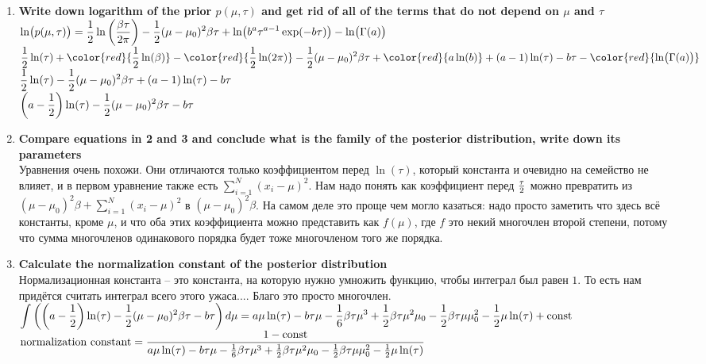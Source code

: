 \documentclass{article}
\newcommand{\red}[1]{{\color{red}{#1}}}
\begin{document}
{\begin{enumerate}
    \item \textbf{Write down logarithm of the prior $p(\mu, \tau)$ and get rid of all of the terms that do not depend on $\mu$ and $\tau$} \\
      $\displaystyle \ln \bigl(p(\mu, \tau)\bigr) = \frac12\ln\left(\frac{\beta \tau}{2\pi}\right) - \frac12 (\mu - \mu_0)^2\beta\tau + \ln\bigl(b^a \tau^{a-1}\exp(-b\tau)\bigr) - \ln\bigl(\Gamma(a)\bigr) $ \vspace{0.5em} \\
      $\ds \f12\ln(\tau) + \red{\f12\ln(\beta)} - \red{\f12\ln(2\pi)} - \f12 (\mu - \mu_0)^2\beta\tau +
      \red{a\ln(b)} + (a-1)\ln(\tau) - b\tau - \red{\ln\bigl(\Gamma(a)\bigr)}$ \vspace{0.5em} \\
      $\displaystyle \frac12\ln(\tau) - \frac12 (\mu - \mu_0)^2\beta\tau + (a-1)\ln(\tau) - b\tau$ \vspace{0.5em} \\
      $\displaystyle \left(a-\frac12\right)\ln(\tau) - \frac12 (\mu - \mu_0)^2\beta\tau - b\tau$

    \item \textbf{Compare equations in 2 and 3 and conclude what is the family of the posterior distribution, write down its parameters} \\
      Уравнения очень похожи.
      Они отличаются только коэффициентом перед $\ln(\tau)$, который константа и очевидно на семейство не влияет,
      и в первом уравнение также есть $\sum_{i=1}^N (x_i - \mu)^2$.
      Нам надо понять как коэффициент перед $\frac\tau2$ можно превратить из $(\mu - \mu_0)^2\beta + \sum_{i=1}^N (x_i - \mu)^2$
      в $(\mu - \mu_0)^2\beta$.
      На самом деле это проще чем могло казаться: надо просто заметить что здесь всё константы, кроме $\mu$,
      и что оба этих коэффициента можно представить как $f(\mu)$, где $f$ это некий многочлен второй степени,
      потому что сумма многочленов одинакового порядка будет тоже многочленом того же порядка.

    \item \textbf{Calculate the normalization constant of the posterior distribution} \\
      Нормализационная константа -- это константа, на которую нужно умножить функцию, чтобы интеграл был равен $1$.
      То есть нам придётся считать интеграл всего этого ужаса.... Благо это просто многочлен. \vspace{0.5em} \\
      $\displaystyle \int \left(\left(a - \frac12\right) \ln(\tau) - \frac12 (\mu - \mu_0)^2 \beta \tau - b \tau\right) d\mu =
      a \mu \ln(\tau) - b \tau \mu - \frac16 \beta \tau \mu^3 + \frac12 \beta \tau \mu^2 \mu_0 - \frac12 \beta \tau \mu \mu_0^2 - \frac12 \mu \ln(\tau) + \text{const}$ \vspace{0.5em} \\
      $\displaystyle \text{normalization constant} = \frac{1 - \text{const}}{a \mu \ln(\tau) - b \tau \mu - \frac16 \beta \tau \mu^3 + \frac12 \beta \tau \mu^2 \mu_0 - \frac12 \beta \tau \mu \mu_0^2 - \frac12 \mu \ln(\tau)}$
  \end{enumerate}
}
\end{document}
